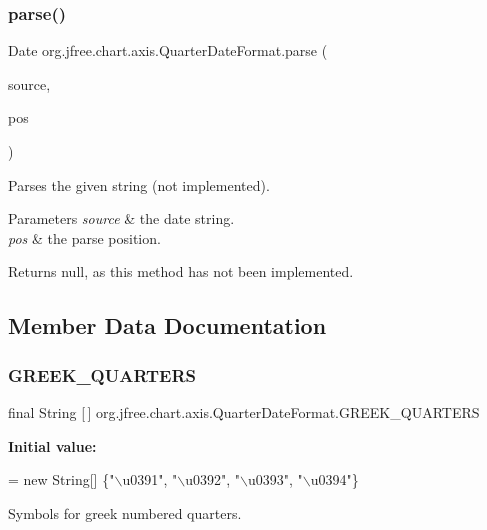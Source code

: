 \subsubsection{\texorpdfstring{parse()}{parse()}}
{\footnotesize\ttfamily Date org.\+jfree.\+chart.\+axis.\+Quarter\+Date\+Format.\+parse (\begin{DoxyParamCaption}\item[{String}]{source,  }\item[{Parse\+Position}]{pos }\end{DoxyParamCaption})}

Parses the given string (not implemented).


\begin{DoxyParams}{Parameters}
{\em source} & the date string. \\
\hline
{\em pos} & the parse position.\\
\hline
\end{DoxyParams}
\begin{DoxyReturn}{Returns}
{\ttfamily null}, as this method has not been implemented. 
\end{DoxyReturn}


\subsection{Member Data Documentation}
\mbox{\label{classorg_1_1jfree_1_1chart_1_1axis_1_1_quarter_date_format_a35ee90809e7468b2f8913afdd2e9acc6}} 
\subsubsection{\texorpdfstring{G\+R\+E\+E\+K\+\_\+\+Q\+U\+A\+R\+T\+E\+RS}{GREEK\_QUARTERS}}
{\footnotesize\ttfamily final String \mbox{[}$\,$\mbox{]} org.\+jfree.\+chart.\+axis.\+Quarter\+Date\+Format.\+G\+R\+E\+E\+K\+\_\+\+Q\+U\+A\+R\+T\+E\+RS\hspace{0.3cm}{\ttfamily [static]}}

{\bfseries Initial value\+:}
\begin{DoxyCode}
= \textcolor{keyword}{new} String[] \{\textcolor{stringliteral}{"\(\backslash\)u0391"},
            \textcolor{stringliteral}{"\(\backslash\)u0392"}, \textcolor{stringliteral}{"\(\backslash\)u0393"}, \textcolor{stringliteral}{"\(\backslash\)u0394"}\}
\end{DoxyCode}
Symbols for greek numbered quarters.

